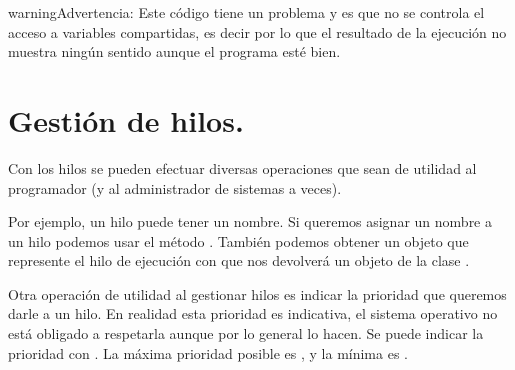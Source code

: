\documentclass[letterpaper,10pt,spanish]{sphinxmanual}
\begin{document}
\begin{sphinxVerbatim}[commandchars=\\\{\}]
           \PYG{o}{[}\PYG{o}{]}  
                 
                 
                    
                          
                          
\end{sphinxVerbatim}

\begin{sphinxadmonition}{warning}{Advertencia:}
Este código tiene un problema  y es que no se controla el acceso a variables compartidas, es decir  por lo que el resultado de la ejecución no muestra ningún sentido aunque el programa esté bien.
\end{sphinxadmonition}


\section{Gestión de hilos.}
\label{\detokenize{textos/tema2:gestion-de-hilos}}
Con los hilos se pueden efectuar diversas operaciones que sean de utilidad al programador (y al administrador de sistemas a veces).

Por ejemplo, un hilo puede tener un nombre. Si queremos asignar un nombre a un hilo podemos usar el método . También podemos obtener un objeto que represente el hilo de ejecución con  que nos devolverá un objeto de la clase .

Otra operación de utilidad al gestionar hilos es indicar la prioridad que queremos darle a un hilo. En realidad esta prioridad es indicativa, el sistema operativo no está obligado a respetarla aunque por lo general lo hacen. Se puede indicar la prioridad con . La máxima prioridad posible es , y la mínima es .
\end{document}
